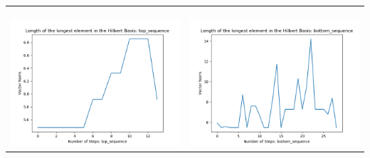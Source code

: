 \documentclass[10pt]{article}
\begin{document}
\begin{tabular}{c|c}
\begin{minipage}{.45\textwidth}
\end{minipage} \\ \\
\hline \\\begin{minipage}{.45\textwidth}
\includegraphics[width=\textwidth]{"DATA/5d/6 generators 2 bound D/top_sequence LENGTH"}
\end{minipage} &
\begin{minipage}{.45\textwidth}
\includegraphics[width=\textwidth]{"DATA/5d/6 generators 2 bound D bottomup/bottom_sequence LENGTH"}
\end{minipage}
\end{tabular}
\end{document}
